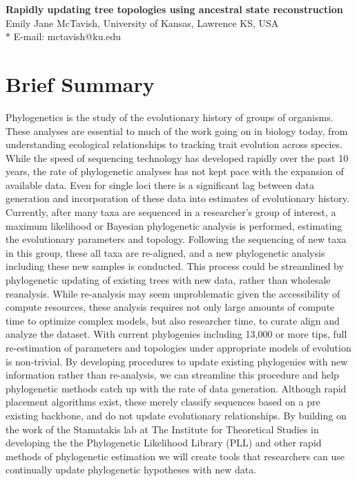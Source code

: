 \documentclass[10pt]{article}
\date{}
\begin{document}
\begin{flushleft}
{\Large
\textbf{Rapidly updating tree topologies using ancestral state reconstruction}
}
\\
Emily Jane McTavish, University of Kansas, Lawrence KS, USA
\\

$\ast$ E-mail: mctavish@ku.edu
\end{flushleft}

\section*{Brief Summary}

Phylogenetics is the study of the evolutionary history of groups of organisms.
These analyses are essential to much of the work going on in biology today, from understanding ecological relationships to tracking trait evolution across species.
While the speed of sequencing technology has developed rapidly over the past 10 years, the rate of phylogenetic analyses has not kept pace with the expansion of available data. 
Even for single loci there is a significant lag between data generation and incorporation of these data into estimates of evolutionary history. 
Currently, after many taxa are sequenced in a researcher's group of interest, a  maximum likelihood or Bayesian phylogenetic analysis is performed, estimating the evolutionary parameters and topology. 
Following the sequencing of new taxa in this group, these all taxa are re-aligned, and a new phylogenetic analysis including these new samples is conducted. 
This process could be streamlined by phylogenetic updating of existing trees with new data, rather than wholesale reanalysis. 
While re-analysis may seem unproblematic given the accessibility of compute resources, these analysis requires not only large amounts of compute time to optimize complex models, but also researcher time, to curate align and analyze the dataset. 
With current phylogenies including 13,000 \cite{smith_rates_2008} or more tips, full re-estimation of parameters and topologies under appropriate models of evolution is non-trivial. 
By developing procedures to update existing phylogenies with new information rather than re-analysis, we can streamline this procedure and help phylogenetic methods catch up with the rate of data generation. 
Although rapid placement algorithms exist, these merely classify sequences based on a pre existing backbone, and do not update evolutionary relationships. 
By building on the work of the Stamatakis lab at The Institute for Theoretical Studies in developing the the Phylogenetic Likelihood Library (PLL) and other rapid methods of phylogenetic estimation we will create tools that researchers can use continually update phylogenetic hypotheses with new data.
\end{document}
